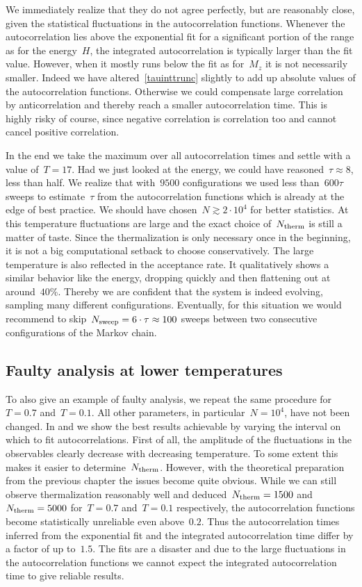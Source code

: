 We immediately realize that they do not agree perfectly, but are reasonably
close, given the statistical fluctuations in the autocorrelation functions.
Whenever the autocorrelation lies above the exponential fit for a significant
portion of the range as for the energy~$H$, the integrated autocorrelation is
typically larger than the fit value. However, when it mostly runs below the fit
as for~$M_z$ it is not necessarily smaller. Indeed we have
altered~\eqref{tauinttrunc} slightly to add up absolute values of the
autocorrelation functions. Otherwise we could compensate large correlation by
anticorrelation and thereby reach a smaller autocorrelation time. This is highly
risky of course, since negative correlation is correlation too and cannot cancel
positive correlation.

In the end we take the maximum over all autocorrelation times and settle with a
value of~$T=17$. Had we just looked at the energy, we could have reasoned~$\tau
\approx 8$, less than half. We realize that with~$9500$ configurations we used
less than~$600 \tau$ sweeps to estimate~$\tau$ from the autocorrelation
functions which is already at the edge of best practice. We should have
chosen~$N \gtrsim 2\cdot 10^4$ for better statistics. At this temperature
fluctuations are large and the exact choice of~$N_{\mathrm{therm}}$ is still a
matter of taste. Since the thermalization is only necessary once in the
beginning, it is not a big computational setback to choose conservatively. The
large temperature is also reflected in the acceptance rate. It qualitatively
shows a similar behavior like the energy, dropping quickly and then flattening
out at around~$40$\%. Thereby we are confident that the system is indeed
evolving, sampling many different configurations. Eventually, for this situation
we would recommend to skip~$N_{\mathrm{sweep}} = 6 \cdot \tau \approx 100$ sweeps between
two consecutive configurations of the Markov chain.

\subsection{Faulty analysis at lower temperatures}

To also give an example of faulty analysis, we repeat the same procedure
for~$T=0.7$ and~$T=0.1$. All other parameters, in particular~$N=10^4$, have not
been changed. In  and  we show the best
results achievable by varying the interval on which to fit autocorrelations.
First of all, the amplitude of the fluctuations in the observables clearly
decrease with decreasing temperature. To some extent this makes it easier to
determine~$N_{\mathrm{therm}}$. However, with the theoretical preparation from the
previous chapter the issues become quite obvious. While we can still observe
thermalization reasonably well and deduced~$N_{\mathrm{therm}}=1500$ and~$N_{\mathrm{therm}}=5000$
for~$T=0.7$ and~$T=0.1$ respectively, the autocorrelation functions become
statistically unreliable even above~$0.2$. Thus the autocorrelation times
inferred from the exponential fit and the integrated autocorrelation time differ
by a factor of up to~$1.5$. The fits are a disaster and due to the large
fluctuations in the autocorrelation functions we cannot expect the integrated
autocorrelation time to give reliable results.

